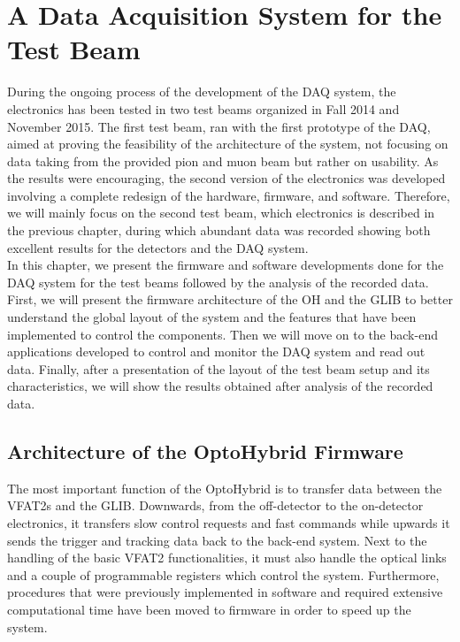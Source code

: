 \chapter{A Data Acquisition System for the Test Beam}
\label{chap:II-3-test-beam}

  During the ongoing process of the development of the DAQ system, the electronics has been tested in two test beams organized in Fall 2014 and November 2015. The first test beam, ran with the first prototype of the DAQ, aimed at proving the feasibility of the architecture of the system, not focusing on data taking from the provided pion and muon beam but rather on usability. As the results were encouraging, the second version of the electronics was developed involving a complete redesign of the hardware, firmware, and software. Therefore, we will mainly focus on the second test beam, which electronics is described in the previous chapter, during which abundant data was recorded showing both excellent results for the detectors and the DAQ system. \\

  In this chapter, we present the firmware and software developments done for the DAQ system for the test beams followed by the analysis of the recorded data. First, we will present the firmware architecture of the OH and the GLIB to better understand the global layout of the system and the features that have been implemented to control the components. Then we will move on to the back-end applications developed to control and monitor the DAQ system and read out data. Finally, after a presentation of the layout of the test beam setup and its characteristics, we will show the results obtained after analysis of the recorded data.

  \section{Architecture of the OptoHybrid Firmware}

    The most important function of the OptoHybrid is to transfer data between the VFAT2s and the GLIB. Downwards, from the off-detector to the on-detector electronics, it transfers slow control requests and fast commands while upwards it sends the trigger and tracking data back to the back-end system. Next to the handling of the basic VFAT2 functionalities, it must also handle the optical links and a couple of programmable registers which control the system. Furthermore, procedures that were previously implemented in software and required extensive computational time have been moved to firmware in order to speed up the system. \\

